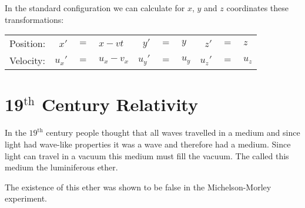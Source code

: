 \documentclass{article}
\begin{document}
    In the standard configuration we can calculate for \(x\), \(y\) and \(z\) coordinates these transformations:
    \begin{center}
        \begin{tabular}{lrclrclrcl}
            Position: & \(x'\) & \hspace{-0.3cm}\(=\)\hspace{-0.3cm} & \(x-vt\) & 
            \(y'\) & \hspace{-0.3cm}\(=\)\hspace{-0.3cm} & \(y\) & 
            \(z'\) & \hspace{-0.3cm}\(=\)\hspace{-0.3cm} & \(z\)\\
            Velocity: & \(u_x'\) & \hspace{-0.3cm}\(=\)\hspace{-0.3cm} & \(u_x-v_x\) & 
            \(u_y'\) & \hspace{-0.3cm}\(=\)\hspace{-0.3cm} & \(u_y\) & 
            \(u_z'\) & \hspace{-0.3cm}\(=\)\hspace{-0.3cm} & \(u_z\)
        \end{tabular}
    \end{center}

    \section{19\(^\text{th}\) Century Relativity}
    In the \(19^\text{th}\) century people thought that all waves travelled in a medium and since light had wave-like properties it was a wave and therefore had a medium. Since light can travel in a vacuum this medium must fill the vacuum. The called this medium the luminiferous ether.
    
    The existence of this ether was shown to be false in the Michelson-Morley experiment.
    
\end{document}
